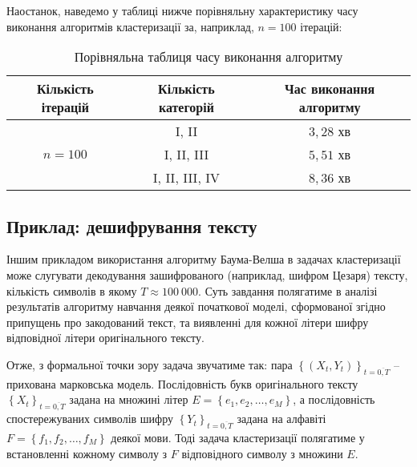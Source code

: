 Наостанок, наведемо у таблиці нижче порівняльну характеристику часу виконання алгоритмів кластеризації за, наприклад, $n=100$ ітерацій:

\vspace{0.4cm}
\begin{table}[H]
    \begin{center}
        \begin{tabular}{||c|c|c||}
            \hline
            Кількість ітерацій & Кількість категорій & \parbox{4cm}{\vspace{0.2cm}\centering Час виконання  алгоритму \vspace{0.2cm}} \\
            \hline
             & I, II & $3{,}28$ хв \\
            & I, II, III & $5{,}51$ хв \\
            & I, II, III, IV & $8{,}36$ хв \\
            \hline
        \end{tabular}
    \end{center}
    \caption{Порівняльна таблиця часу виконання алгоритму}
\end{table}

\newpage
\subsection{Приклад: дешифрування тексту}
\label{section: text decoding by Baum-Welch}

Іншим прикладом використання алгоритму Баума-Велша в задачах кластеризації може слугувати декодування зашифрованого (наприклад, шифром Цезаря) тексту, кількість символів в якому $T\approx 100\ 000$. Суть завдання полягатиме в аналізі результатів алгоритму навчання деякої початкової моделі, сформованої згідно припущень про закодований текст, та виявленні для кожної літери шифру відповідної літери оригінального тексту.

Отже, з формальної точки зору задача звучатиме так: пара $\left\{(X_t,Y_t)\right\}_{t=\overline{0,T}}$ -- прихована марковська модель. Послідовність букв оригінального тексту $\left\{ X_t \right\}_{t=\overline{0,T}}$ задана на множині літер $E=\left\{e_1,e_2, \ldots, e_M\right\}$, а послідовність спостережуваних символів шифру $\left\{ Y_t \right\}_{t=\overline{0,T}}$ задана на алфавіті $F=\left\{f_1,f_2, \ldots, f_M\right\}$ деякої мови. Тоді задача кластеризації полягатиме у встановленні кожному символу з $F$ відповідного символу з множини $E$.

